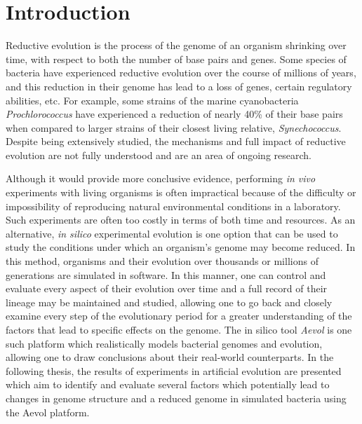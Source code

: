 \chapter{Introduction}\label{ch:intro}
Reductive evolution is the process of the genome of an organism shrinking over time, with respect to both the number of base pairs and genes. Some species of bacteria have experienced reductive evolution over the course of millions of years, and this reduction in their genome has lead to a loss of genes, certain regulatory abilities, etc. For example, some strains of the marine cyanobacteria \textit{Prochlorococcus} have experienced a reduction of nearly 40\% of their base pairs when compared to larger strains of their closest living relative, \textit{Synechococcus}\cite{sun_zhiyi_blanchard}. Despite being extensively studied, the mechanisms and full impact of reductive evolution are not fully understood and are an area of ongoing research. 

Although it would provide more conclusive evidence, performing \textit{in vivo} experiments with living organisms is often impractical because of the difficulty or impossibility of reproducing natural environmental conditions in a laboratory. Such experiments are often too costly in terms of both time and resources. As an alternative, \textit{in silico} experimental evolution is one option that can be used to study the conditions under which an organism's genome may become reduced. In this method, organisms and their evolution over thousands or millions of generations are simulated in software. In this manner, one can control and evaluate every aspect of their evolution over time and a full record of their lineage may be maintained and studied, allowing one to go back and closely examine every step of the evolutionary period for a greater understanding of the factors that lead to specific effects on the genome. The in silico tool \textit{Aevol} is one such platform which realistically models bacterial genomes and evolution, allowing one to draw conclusions about their real-world counterparts. In the following thesis, the results of experiments in artificial evolution are presented which aim to identify and evaluate several factors which potentially lead to changes in genome structure and a reduced genome in simulated bacteria using the Aevol platform. 

